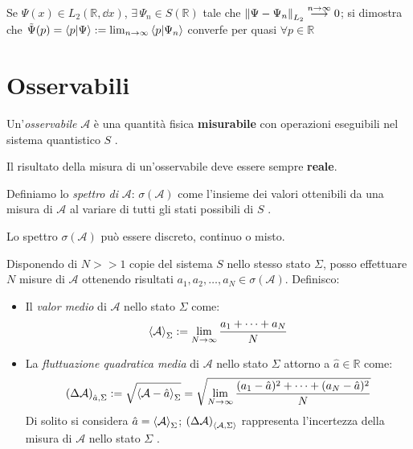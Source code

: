 Se \(\Psi(x) \in L_2(\mathbb{R}, \dd{x})\), \(\exists \, \Psi_n \in S(\mathbb{R})\) tale che \(\norm{\Psi-\Psi_n}_{L_2}\overset{n \to \infty}{\longrightarrow} 0\); 
si dimostra che \(\tilde{\Psi}(p)= \braket{p}{\Psi} : = \lim_{n\to \infty}\braket{p}{\Psi_n}\) converfe per quasi \(\forall p \in \mathbb{R}\)


\section{Osservabili}
\begin{definition}
    Un'\textit{osservabile} \(\mathcal{A}\) è una quantità fisica \textbf{misurabile } con operazioni eseguibili nel sistema quantistico \(S\) .
\end{definition}
Il risultato della misura di un'osservabile deve essere sempre \textbf{reale}.

\begin{definition}
    Definiamo lo \textit{spettro di } \(\mathcal{A}\): \(\sigma(\mathcal{A})\) come l'insieme dei valori ottenibili da una
    misura di \(\mathcal{A}\) al variare di tutti gli stati possibili di \(S\) .
\end{definition}

Lo spettro \(\sigma(\mathcal{A})\) può essere discreto, continuo o misto.

\begin{definition}
    Disponendo di \(N >> 1 \) copie del sistema \(S\) nello stesso stato \(\Sigma\), posso effettuare \(N\) misure di \(\mathcal{A}\) 
    ottenendo risultati \(a_1,a_2,\dots, a_N \in \sigma(\mathcal{A})\). Definisco:
    \begin{itemize}
        \item Il \textit{valor medio } di \(\mathcal{A}\) nello stato \(\Sigma\) come: \[
            \expval{\mathcal{A}}_\Sigma := \lim_{N\to \infty} \frac{a_1+\dots+a_N}{N}
        \]
        \item La \textit{fluttuazione quadratica media} di \(\mathcal{A}\) nello stato \(\Sigma\) attorno a \(\hat{a} \in \mathbb{R}\) come: \[
            \left( \Delta \mathcal{A} \right)_{\hat{a}, \Sigma}:= \sqrt{\expval{\mathcal{A}- \hat{a}}_\Sigma}= \sqrt{\lim_{N \to \infty} \frac{(a_1-\hat{a})^2+ \dots+ (a_N-\hat{a})^2}{N}} 
        \] Di solito si considera \(\hat{a}= \expval{\mathcal{A}}_\Sigma\); \(\left( \Delta\mathcal{A} \right)_{\expval{\mathcal{A}, \Sigma}}\) rappresenta l'incertezza della misura di \(\mathcal{A}\) nello stato \(\Sigma\) .
    \end{itemize}
\end{definition}

